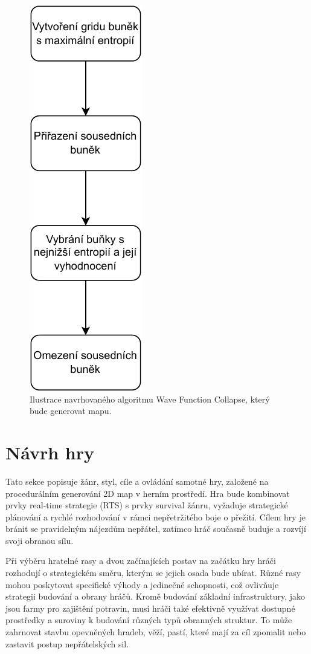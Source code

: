 \begin{figure}[H]
	\centering
	\includegraphics[scale=0.9]{obrazky-figures/wfcAlgorithm.pdf}
	\caption{Ilustrace navrhovaného algoritmu Wave Function Collapse, který bude generovat mapu.}
\end{figure}

\section{Návrh hry}
\label{GameDesign}
Tato sekce popisuje žánr, styl, cíle a ovládání samotné hry, založené na procedurálním generování 2D map v herním prostředí. Hra bude kombinovat prvky real-time strategie (RTS) s prvky survival žánru, vyžaduje strategické plánování a rychlé rozhodování v rámci nepřetržitého boje o přežití. Cílem hry je bránit se pravidelným nájezdům nepřátel, zatímco hráč současně buduje a rozvíjí svoji obranou sílu.

Při výběru hratelné rasy a dvou začínajících postav na začátku hry hráči rozhodují o strategickém směru, kterým se jejich osada bude ubírat. Různé rasy mohou poskytovat specifické výhody a jedinečné schopnosti, což ovlivňuje strategii budování a obrany hráčů. Kromě budování základní infrastruktury, jako jsou farmy pro zajištění potravin, musí hráči také efektivně využívat dostupné prostředky a suroviny k budování různých typů obranných struktur. To může zahrnovat stavbu opevněných hradeb, věží, pastí, které mají za cíl zpomalit nebo zastavit postup nepřátelských sil.

